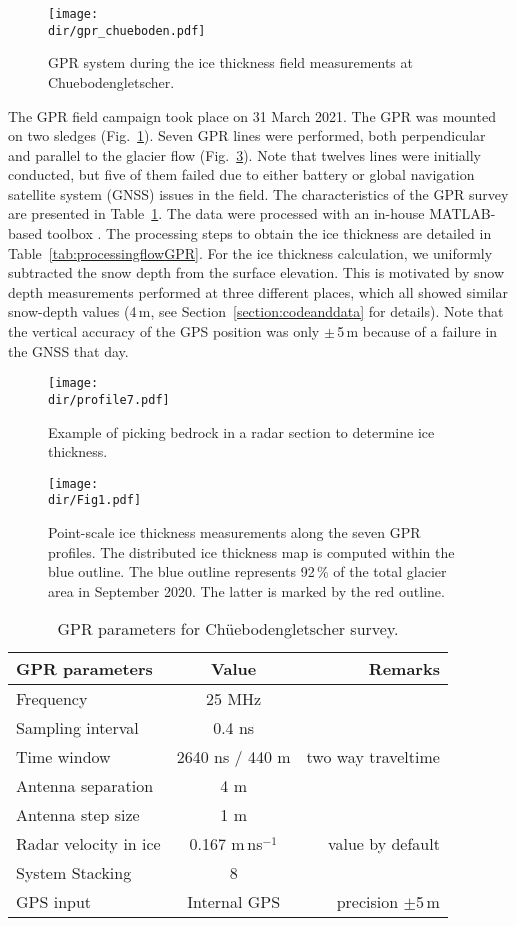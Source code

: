 \begin{figure}
\centering
\texttt{[image: \\dir/gpr\_chueboden.pdf]}
\caption{GPR system during the ice thickness field measurements at Chuebodengletscher.}
\label{fig:gpr}
\end{figure}

The GPR field campaign took place on 31 March 2021. The GPR was mounted on two sledges (Fig.~\ref{fig:gpr}). Seven GPR lines were performed, both perpendicular and parallel to the glacier flow (Fig.~\ref{fig:fig1}). Note that twelves lines were initially conducted, but five of them failed due to either battery or global navigation satellite system (GNSS) issues in the field. The characteristics of the GPR survey are presented in Table~\ref{tab_gpr}. The data were processed with an in-house MATLAB-based toolbox \citep[e.g.][]{Langhammer&al2019}. The processing steps to obtain the ice thickness are detailed in Table~\ref{tab:processingflowGPR}. For the ice thickness calculation, we uniformly subtracted the snow depth from the surface elevation. This is motivated by snow depth measurements performed at three different places, which all showed similar snow-depth values (4\,m, see Section~\ref{section:codeanddata} for details). Note that the vertical accuracy of the GPS position was only $\pm$\,5\,m because of a failure in the GNSS that day. 

\begin{figure}[h!]
\centering
\texttt{[image: \\dir/profile7.pdf]}
\caption{Example of picking bedrock in a radar section to determine ice thickness.}
\label{fig:prof7}
\end{figure}

\begin{figure}[h!]
\centering
\texttt{[image: \\dir/Fig1.pdf]}
\caption{Point-scale ice thickness measurements along the seven GPR profiles. The distributed ice thickness map is computed within the blue outline. The blue outline represents 92\,\% of the total glacier area in September 2020. The latter is marked by the red outline.}
\label{fig:fig1}
\end{figure}

\begin{table}[h!]
    \centering
    \begin{tabular}{l c r}
         \hline
\textbf{GPR parameters}  & \textbf{Value} & \textbf{Remarks} \\
\hline
Frequency & 25 MHz  \\
Sampling interval & 0.4 ns \\
Time window & 2640 ns / 440 m & two way traveltime\\
Antenna separation & 4 m \\
Antenna step size & 1 m \\
Radar velocity in ice & 0.167 m\,ns$^{-1}$ & value by default \\
System Stacking & 8 & \\
GPS input & Internal GPS & precision $\pm$5\,m\\
\hline
    \end{tabular}
    \caption{GPR parameters for Chüebodengletscher survey.}
    \label{tab_gpr}
\end{table}


